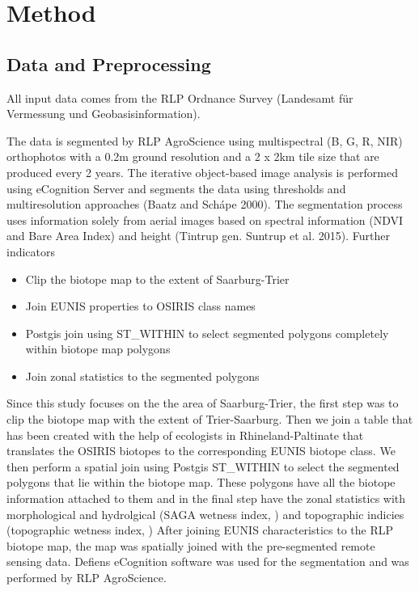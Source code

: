 \documentclass[authoryear, review,12pt,number]{elsarticle}
\begin{document}
\section{Method}

\subsection{Data and Preprocessing}
All input data comes from the RLP Ordnance Survey (Landesamt f\"ur Vermessung und
Geobasisinformation).

The data is segmented by RLP AgroScience using
multispectral (B, G, R, NIR) orthophotos with a 0.2m ground resolution and a
2 x 2km tile size that are produced every 2 years. The iterative object-based
image analysis is performed using eCognition Server and segments
the data using thresholds and multiresolution approaches (Baatz and
Sch\'ape 2000). The segmentation process uses information solely from aerial
images based on spectral information (NDVI and Bare Area Index) and height
(Tintrup gen. Suntrup et al. 2015). Further indicators 

\begin{itemize}
    \item Clip the biotope map to the extent of Saarburg-Trier
    \item Join EUNIS properties to OSIRIS class names
    \item Postgis join using ST\_WITHIN to select segmented polygons completely
        within biotope map polygons
    \item Join zonal statistics to the segmented polygons
\end{itemize}
Since this study focuses on the the area of Saarburg-Trier, the first step was
to clip the biotope map with the extent of Trier-Saarburg. Then we join a table
that has been created with the help of ecologists in Rhineland-Paltinate that
translates the OSIRIS biotopes to the corresponding EUNIS biotope class. We then
perform a spatial join using Postgis ST\_WITHIN to select the segmented polygons
that lie within the biotope map. These polygons have all the biotope information
attached to them and in the final step have the zonal statistics with
morphological and hydrolgical (SAGA wetness index, ) and topographic indicies (topographic wetness
index, )
After joining EUNIS characteristics to the RLP biotope map, the map was 
spatially joined with the pre-segmented remote sensing data. Defiens eCognition
software was used for the segmentation and was performed by RLP AgroScience. 
\end{document}
